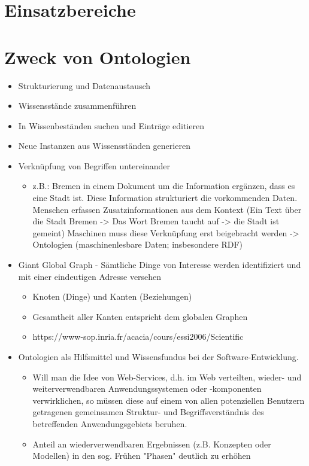 \section{Einsatzbereiche}
\section*{Zweck von Ontologien}
\begin{itemize}
	\item Strukturierung und Datenaustausch
	\item Wissensstände zusammenführen
	\item In Wissenbeständen suchen und Einträge editieren
	\item Neue Instanzen aus Wissensständen generieren
	\item Verknüpfung von Begriffen untereinander
	\begin{itemize}
		\item z.B.: Bremen in einem Dokument um die Information ergänzen, dass es eine Stadt ist. Diese Information strukturiert die vorkommenden Daten. 
		Menschen erfassen Zusatzinformationen aus dem Kontext (Ein Text über die Stadt Bremen -> Das Wort Bremen taucht auf -> die Stadt ist gemeint)
		Maschinen muss diese Verknüpfung erst beigebracht werden -> Ontologien (maschinenlesbare Daten; insbesondere RDF)
	\end{itemize}
	\item Giant Global Graph - Sämtliche Dinge von Interesse werden identifiziert und mit einer eindeutigen Adresse versehen
	\begin{itemize}
		\item Knoten (Dinge) und Kanten (Beziehungen) 
		\item Gesamtheit aller Kanten entspricht dem globalen Graphen
		\item https://www-sop.inria.fr/acacia/cours/essi2006/Scientific%
	\end{itemize}	
	\item Ontologien als Hilfsmittel und Wissensfundus bei der Software-Entwicklung. 
	\begin{itemize}
		\item Will man die Idee von Web-Services, d.h. im Web verteilten, wieder- und weiterverwendbaren Anwendungssystemen oder -komponenten verwirklichen, so müssen diese auf einem von allen potenziellen Benutzern getragenen gemeinsamen Struktur- und Begriffsverständnis des betreffenden Anwendungsgebiets beruhen. 
		\item Anteil an wiederverwendbaren Ergebnissen (z.B. Konzepten oder Modellen) in den sog. Frühen "Phasen" deutlich zu erhöhen
	\end{itemize}	
\end{itemize}
	
